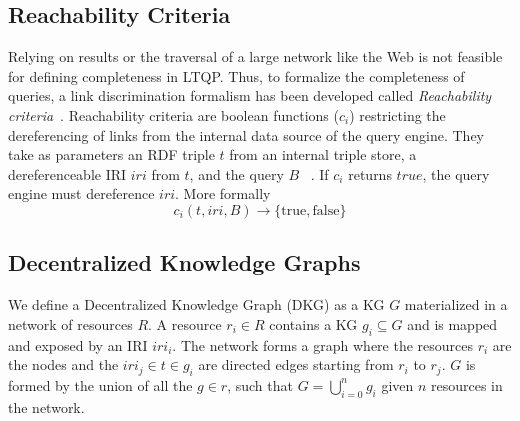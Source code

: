 \subsection{Reachability Criteria}

Relying on results or the traversal of a large network like the Web is not feasible for defining completeness in LTQP.
Thus, to formalize the completeness of queries, a link discrimination formalism has been developed called \emph{Reachability criteria}~\cite{Hartig2012}.
Reachability criteria are boolean functions ($c_i$) restricting the dereferencing of links from the internal data source of the query engine.
They take as parameters an RDF triple $t$ from an internal triple store, a dereferenceable IRI $iri$ from $t$, and the query $B$~\cite{Hartig2012} .
If $c_i$ returns $true$, the query engine must dereference $iri$.
More formally
\begin{equation}\label{eq:reachabilityCriteria}
c_i(t, iri, B) \rightarrow \{\mathrm{true}, \mathrm{false}\}
\end{equation}

\subsection{Decentralized Knowledge Graphs}

We define a Decentralized Knowledge Graph (DKG) as a KG $G$ materialized in a network of resources $R$.
A resource $r_i \in R$ contains a KG $g_i \subseteq G$ and is mapped and exposed by an IRI $iri_i$.
The network forms a graph where the resources $r_i$ are the nodes and the $iri_j \in t \in g_i$ are directed edges starting from $r_i$ to $r_j$.
$G$ is formed by the union of all the $g \in r$, such that $G = \bigcup_{i=0}^{n}g_i$ given $n$ resources in the network.